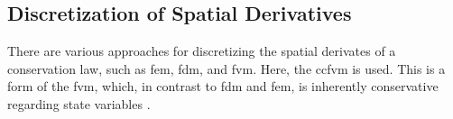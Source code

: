 
\subsection{Discretization of Spatial Derivatives}\label{sec:disc-space-FVM}

There are various approaches for discretizing the spatial derivates of a conservation law, such as \gls{fem}, \gls{fdm}, and \gls{fvm}.
Here, the \gls{ccfvm} is used. This is a form of the \gls{fvm}, which, in contrast to \gls{fdm} and \gls{fem}, is inherently conservative regarding state variables \autocite{hinkelmann2005}.

